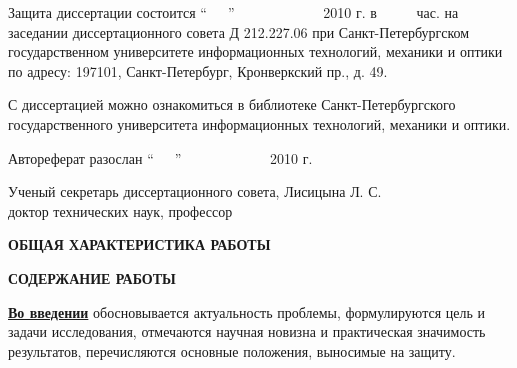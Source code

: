 \documentclass[12pt,a4paper]{article}
\makeatletter
\theoremstyle{definition}
\theoremstyle{plain}
\renewcommand{\@oddhead}{\hfill{\large \thepage}\hfill}
\renewcommand{\@oddfoot}{}
\renewcommand{\@evenhead}{\hfill{\large \thepage}\hfill}
\renewcommand{\@evenfoot}{}
\newcommand{\afsection}[1]{\par \begin{center}\textbf{\MakeUppercase{#1}}\end{center}}
\newcommand{\afsubsection}[1]{\par \underline{\textbf{#1}}}
\makeatother
\begin{document}
\vspace*{\fill}

\noindent
Защита диссертации состоится ``\ \ \ '' \hspace{1mm} \ \ \ \ \ \ \ \ \ \ \ \ 
2010 г. в \ \ \ \ \  час.  на заседании диссертационного совета 
Д 212.227.06 
при Санкт-Петербургском государственном университете информационных технологий, механики и оптики 
по адресу: 197101, Санкт-Петербург, Кронверкский пр., д. 49.


\vspace{1cm}

\noindent
С диссертацией можно ознакомиться в библиотеке
Санкт-Петербургского государственного университета информационных технологий, механики и оптики.


\vspace{1cm}

\noindent
Автореферат разослан \hspace{2mm}``\ \ \ '' \hspace{1mm}
\ \ \ \ \ \ \ \ \ \ \ \  2010 г.


\vspace*{\fill}
\noindent Ученый секретарь
диссертационного совета, \hspace*{\fill}Лисицына Л. С.\\
доктор технических наук, профессор




\setlength{\topmargin}{-5mm} \makeatletter
\renewcommand{\@oddhead}{\hfill{\large \thepage}\hfill}
\renewcommand{\@oddfoot}{}
\renewcommand{\@evenhead}{\hfill{\large \thepage}\hfill}
\renewcommand{\@evenfoot}{}
\makeatother

\newpage
\afsection{Общая характеристика работы}



\newpage
\afsection{Содержание работы}

\afsubsection{Во введении} обосновывается актуальность проблемы, формулируются цель и задачи исследования, отмечаются научная новизна и практическая значимость результатов, перечисляются основные положения, выносимые на защиту.



\end{document}

